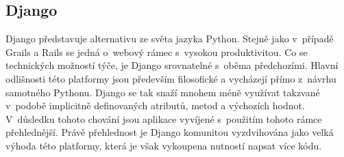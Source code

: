 \subsection{Django}
Django představuje alternativu ze světa jazyka Python. Stejně jako v~případě Grails a Rails se jedná o~webový rámec s~vysokou produktivitou. Co se technických možností týče, je Django srovnatelné s~oběma předchozími. Hlavní odlišnosti této platformy jsou především filosofické a vycházejí přímo z~návrhu samotného Pythonu. Django se tak snaží mnohem méně využívat takzvané  v~podobě implicitně definovaných atributů, metod a výchozích hodnot. V~důsledku tohoto chování jsou aplikace vyvíjené s~použitím tohoto rámce přehlednější. Právě přehlednost je Django komunitou vyzdvihována jako velká výhoda této platformy, která je však vykoupena nutností napsat více kódu.
